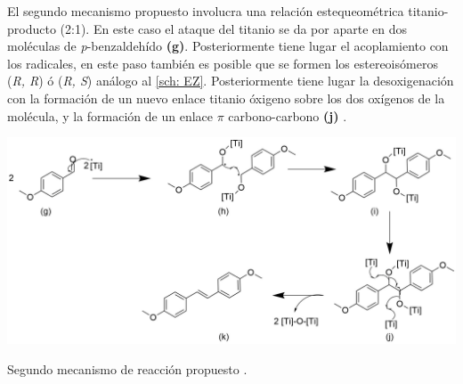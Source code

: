 \documentclass[fleqn,11pt]{SelfArx}
\begin{document}
El segundo mecanismo propuesto involucra una relaci\'on estequeom\'etrica titanio-producto (2:1). En este caso el ataque del titanio se da por aparte en dos mol\'eculas de \textit{p}-benzaldeh\'ido \textbf{(g)}. Posteriormente tiene lugar el acoplamiento con los radicales, en este paso tambi\'en es posible que se formen los estereois\'omeros (\textit{R, R}) \'o (\textit{R, S}) an\'alogo al \autoref{sch: EZ}. Posteriormente tiene lugar la desoxigenaci\'on con la formaci\'on de un nuevo enlace titanio \'oxigeno sobre los dos ox\'igenos de la mol\'ecula, y la formaci\'on de un enlace $\pi$ carbono-carbono \textbf{(j)} \cite{Wang2010}.
\begin{scheme}[h]
	\centering
	\includegraphics[width = \linewidth]{structures/mechanism2.png}
	\caption{Segundo mecanismo de reacci\'on propuesto \cite{Wang2010}.}
\end{scheme}
\end{document}
